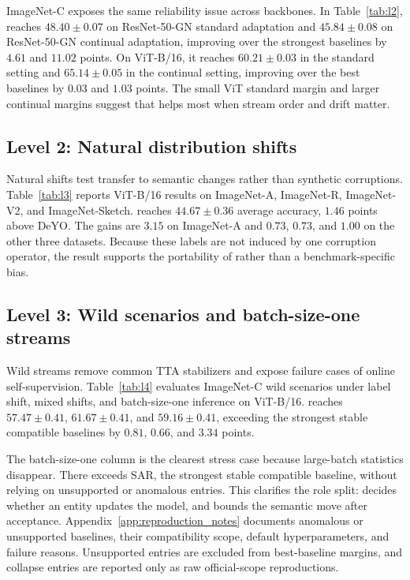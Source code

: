 ImageNet-C exposes the same reliability issue across backbones. In Table~\ref{tab:l2}, \method{} reaches $48.40\pm0.07$ on ResNet-50-GN standard adaptation and $45.84\pm0.08$ on ResNet-50-GN continual adaptation, improving over the strongest baselines by $4.61$ and $11.02$ points. On ViT-B/16, it reaches $60.21\pm0.03$ in the standard setting and $65.14\pm0.05$ in the continual setting, improving over the best baselines by $0.03$ and $1.03$ points. The small ViT standard margin and larger continual margins suggest that \method{} helps most when stream order and drift matter.

\subsection{Level 2: Natural distribution shifts}


Natural shifts test transfer to semantic changes rather than synthetic corruptions. Table~\ref{tab:l3} reports ViT-B/16 results on ImageNet-A, ImageNet-R, ImageNet-V2, and ImageNet-Sketch. \method{} reaches $44.67\pm0.36$ average accuracy, $1.46$ points above DeYO. The gains are $3.15$ on ImageNet-A and $0.73$, $0.73$, and $1.00$ on the other three datasets. Because these labels are not induced by one corruption operator, the result supports the portability of \core{} rather than a benchmark-specific bias.

\subsection{Level 3: Wild scenarios and batch-size-one streams}

Wild streams remove common TTA stabilizers and expose failure cases of online self-supervision. Table~\ref{tab:l4} evaluates ImageNet-C wild scenarios under label shift, mixed shifts, and batch-size-one inference on ViT-B/16. \method{} reaches $57.47\pm0.41$, $61.67\pm0.41$, and $59.16\pm0.41$, exceeding the strongest stable compatible baselines by $0.81$, $0.66$, and $3.34$ points.

The batch-size-one column is the clearest stress case because large-batch statistics disappear. There \method{} exceeds SAR, the strongest stable compatible baseline, without relying on unsupported or anomalous entries. This clarifies the role split: \core{} decides whether an entity updates the model, and \care{} bounds the semantic move after acceptance.
Appendix~\ref{app:reproduction_notes} documents anomalous or unsupported baselines, their compatibility scope, default hyperparameters, and failure reasons. Unsupported entries are excluded from best-baseline margins, and collapse entries are reported only as raw official-scope reproductions.

